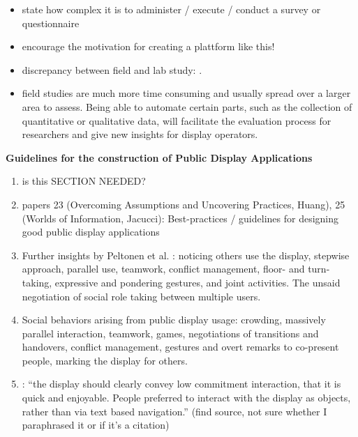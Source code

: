 		\begin{itemize}[itemsep=0pt] 
		\item state how complex it is to administer / execute / conduct a survey or questionnaire
		\item encourage the motivation for creating a plattform like this!
		\item discrepancy between field and lab study: \cite{Ojala2011}.
		\item field studies are much more time consuming and usually spread over a larger area to assess. Being able to automate certain parts, such as the collection of quantitative or qualitative data, will facilitate the evaluation process for researchers and give new insights for display operators.
		\end{itemize}




	\textbf{Guidelines for the construction of Public Display Applications}

		\begin{enumerate}
		\item is this SECTION NEEDED?

		\item papers 23 (Overcoming Assumptions and Uncovering Practices, Huang), 25 (Worlds of Information, Jacucci): Best-practices / guidelines for designing good public display applications


		\item Further insights by Peltonen et al. \cite{peltonen2008s}: noticing others use the display, stepwise approach, parallel use, teamwork, conflict management, floor- and turn-taking, expressive and pondering gestures, and joint activities. The unsaid negotiation of social role taking between multiple users.
		\item Social behaviors arising from public display usage: crowding, massively parallel interaction, teamwork, games, negotiations of transitions and handovers, conflict management, gestures and overt remarks to co-present people, marking the display for others. \cite{peltonen2008s}


		\item \cite{redhead2009designing}: ``the display should clearly convey low commitment interaction, that it is quick and enjoyable. People preferred to interact with the display as objects, rather than via text based navigation.'' (find source, not sure whether I paraphrased it or if it's a citation)

		\end{enumerate}



